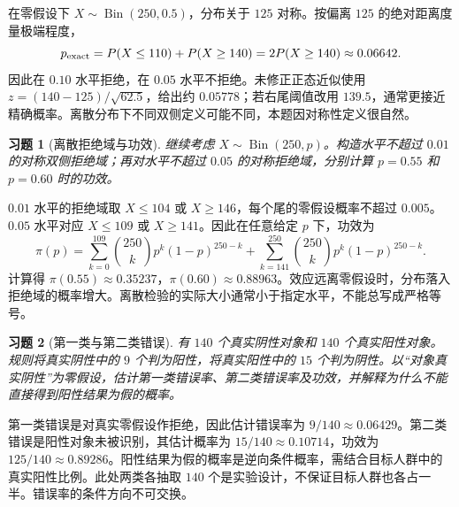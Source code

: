 \documentclass[UTF8,12pt,a4paper,fontset=fandol]{ctexart}
\newtheorem{exercise}{习题}[section]
\begin{document}
\begin{solve}\label{a:M-P8-1ab}在零假设下 $X\sim\operatorname{Bin}(250,0.5)$，分布关于 $125$ 对称。按偏离 $125$ 的绝对距离度量极端程度，\[p_{\rm exact}=P(X\le110)+P(X\ge140)=2P(X\ge140)\approx0.06642.\]因此在 $0.10$ 水平拒绝，在 $0.05$ 水平不拒绝。未修正正态近似使用 $z=(140-125)/\sqrt{62.5}$，给出约 $0.05778$；若右尾阈值改用 $139.5$，通常更接近精确概率。离散分布下不同双侧定义可能不同，本题因对称性定义很自然。\end{solve}

\begin{exercise}[离散拒绝域与功效]\label{q:M-P8-1cd}
继续考虑 $X\sim\operatorname{Bin}(250,p)$。构造水平不超过 $0.01$ 的对称双侧拒绝域；再对水平不超过 $0.05$ 的对称拒绝域，分别计算 $p=0.55$ 和 $p=0.60$ 时的功效。\par{}
\end{exercise}

\begin{solve}\label{a:M-P8-1cd}$0.01$ 水平的拒绝域取 $X\le104$ 或 $X\ge146$，每个尾的零假设概率不超过 $0.005$。$0.05$ 水平对应 $X\le109$ 或 $X\ge141$。因此在任意给定 $p$ 下，功效为\[\pi(p)=\sum_{k=0}^{109}\binom{250}{k}p^k(1-p)^{250-k}+\sum_{k=141}^{250}\binom{250}{k}p^k(1-p)^{250-k}.\]计算得 $\pi(0.55)\approx0.35237$，$\pi(0.60)\approx0.88963$。效应远离零假设时，分布落入拒绝域的概率增大。离散检验的实际大小通常小于指定水平，不能总写成严格等号。\end{solve}

\begin{exercise}[第一类与第二类错误]\label{q:M-P8-2}
有 $140$ 个真实阴性对象和 $140$ 个真实阳性对象。规则将真实阴性中的 $9$ 个判为阳性，将真实阳性中的 $15$ 个判为阴性。以“对象真实阴性”为零假设，估计第一类错误率、第二类错误率及功效，并解释为什么不能直接得到阳性结果为假的概率。\par{}
\end{exercise}

\begin{solve}\label{a:M-P8-2}第一类错误是对真实零假设作拒绝，因此估计错误率为 $9/140\approx0.06429$。第二类错误是阳性对象未被识别，其估计概率为 $15/140\approx0.10714$，功效为 $125/140\approx0.89286$。阳性结果为假的概率是逆向条件概率，需结合目标人群中的真实阳性比例。此处两类各抽取 $140$ 个是实验设计，不保证目标人群也各占一半。错误率的条件方向不可交换。\end{solve}
\end{document}
